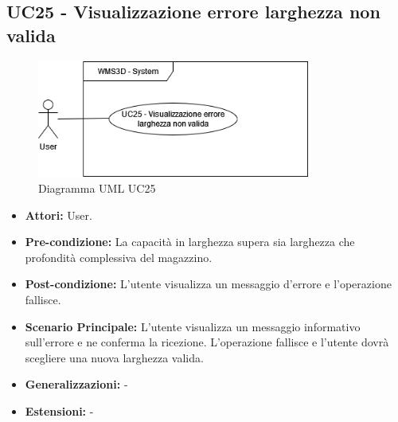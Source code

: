 \subsection{UC25 - Visualizzazione errore larghezza non valida}
\begin{figure}[H]
  \centering
  \includegraphics[width=0.8\textwidth]{UC_diagrams_21-26/UC25.drawio.png}
   \caption{Diagramma UML UC25}
\end{figure}
\begin{itemize}
    \item \textbf{Attori:} User.
    \item \textbf{Pre-condizione:}  La capacità in larghezza supera sia larghezza che profondità complessiva del magazzino.
    \item \textbf{Post-condizione:} L'utente visualizza un messaggio d'errore e l'operazione fallisce.
    \item \textbf{Scenario Principale:}  L'utente visualizza un messaggio informativo sull'errore e ne conferma la ricezione. L'operazione fallisce e l'utente dovrà scegliere una nuova larghezza valida.
    \item \textbf{Generalizzazioni:} -
    \item \textbf{Estensioni:} -
\end{itemize}